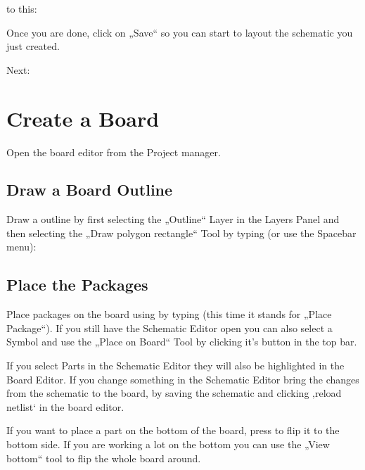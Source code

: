 \documentclass[letterpaper,10pt,czech]{sphinxmanual}
\begin{document}
\noindent{}

to this:

\noindent{}

Once you are done, click on „Save“ so you can start to layout the schematic you just created.

Next: {\hyperref[\detokenize{create-board::doc}]{}}


\chapter{Create a Board}
\label{\detokenize{create-board:create-a-board}}\label{\detokenize{create-board::doc}}
Open the board editor from the Project manager.

\noindent{}


\section{Draw a Board Outline}
\label{\detokenize{create-board:draw-a-board-outline}}
Draw a outline by first selecting the „Outline“ Layer in the Layers Panel and then selecting the „Draw polygon rectangle“ Tool by typing  (or use the Spacebar menu):

\noindent{}


\section{Place the Packages}
\label{\detokenize{create-board:place-the-packages}}
Place packages on the board using by typing  (this time it stands for „Place Package“). If you still have the Schematic Editor open you can also select a Symbol and use the „Place on Board“ Tool by clicking it’s button in the top bar.

If you select Parts in the Schematic Editor they will also be highlighted in the Board Editor. If you change something in the Schematic Editor bring the changes from the schematic to the board, by saving the schematic and clicking ‚reload netlist‘ in the board editor.

\noindent{}

If you want to place a part on the bottom of the board, press  to flip it to the bottom side. If you are working a lot on the bottom you can use the „View bottom“ tool to flip the whole board around.
\end{document}
